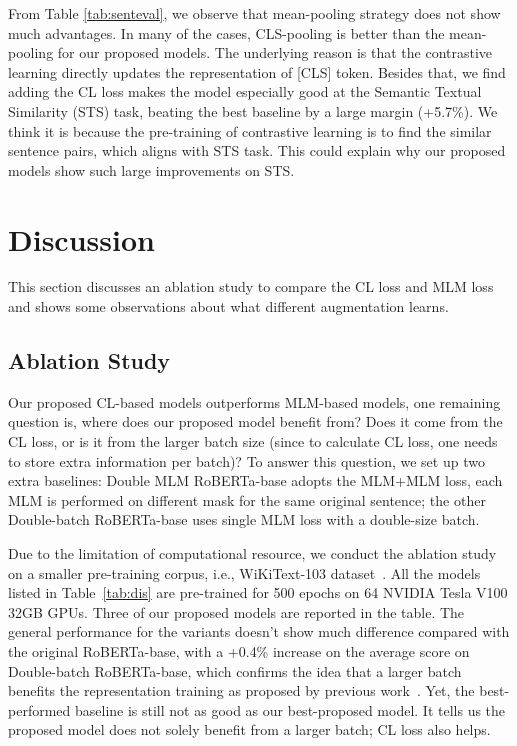 \documentclass[11pt,a4paper]{article}
\begin{document}
From Table \ref{tab:senteval}, we observe that mean-pooling strategy does not show much advantages. In many of the cases, CLS-pooling is better than the mean-pooling for our proposed models. The underlying reason is that the contrastive learning directly updates the representation of [CLS] token. 
Besides that, we find adding the CL loss makes the model especially good at the Semantic Textual Similarity (STS) task, beating the best baseline by a large margin (+5.7\%). We think it is because the pre-training of contrastive learning is to find the similar sentence pairs, which aligns with STS task. This could explain why our proposed models show such large improvements on STS.  \section{Discussion} \label{discussion}
This section discusses an ablation study to compare the CL loss and MLM loss and shows some observations about what different augmentation learns. 

\subsection{Ablation Study} \label{5_1}
Our proposed CL-based models outperforms MLM-based models, one remaining question is, where does our proposed model benefit from? Does it come from the CL loss, or is it from the larger batch size (since to calculate CL loss, one needs to store extra information per batch)? To answer this question, we set up two extra baselines: Double MLM RoBERTa-base adopts the MLM+MLM loss, each MLM is performed on different mask for the same original sentence; the other Double-batch RoBERTa-base uses single MLM loss with a double-size batch. 

Due to the limitation of computational resource, we conduct the ablation study on a smaller pre-training corpus, i.e., WiKiText-103 dataset~\cite{merity2016pointer}. All the models listed in Table~\ref{tab:dis} are pre-trained for 500 epochs on 64 NVIDIA Tesla V100 32GB GPUs. Three of our proposed models are reported in the table. 
The general performance for the variants doesn't show much difference compared with the original RoBERTa-base, with a +0.4\% increase on the average score on Double-batch RoBERTa-base, which confirms the idea that a larger batch benefits the representation training as proposed by previous work~\cite{liu2019roberta}. Yet, the best-performed baseline is still not as good as our best-proposed model. It tells us the proposed model does not solely benefit from a larger batch; CL loss also helps. 
\end{document}
